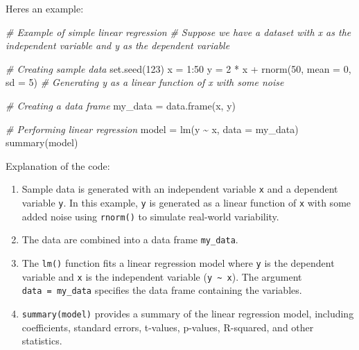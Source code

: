 \documentclass[
]{article}
\newenvironment{Shaded}{}{}
\newcommand{\AttributeTok}[1]{\textcolor[rgb]{0.49,0.56,0.16}{#1}}
\newcommand{\CommentTok}[1]{\textcolor[rgb]{0.38,0.63,0.69}{\textit{#1}}}
\newcommand{\DecValTok}[1]{\textcolor[rgb]{0.25,0.63,0.44}{#1}}
\newcommand{\FunctionTok}[1]{\textcolor[rgb]{0.02,0.16,0.49}{#1}}
\newcommand{\NormalTok}[1]{#1}
\newcommand{\OtherTok}[1]{\textcolor[rgb]{0.00,0.44,0.13}{#1}}
\newcommand{\SpecialCharTok}[1]{\textcolor[rgb]{0.25,0.44,0.63}{#1}}
\begin{document}
Here\textquotesingle s an example:

\begin{Shaded}
\begin{Highlighting}[]
\CommentTok{\# Example of simple linear regression}
\CommentTok{\# Suppose we have a dataset with \textquotesingle{}x\textquotesingle{} as the independent variable and \textquotesingle{}y\textquotesingle{} as the dependent variable}

\CommentTok{\# Creating sample data}
\FunctionTok{set.seed}\NormalTok{(}\DecValTok{123}\NormalTok{)}
\NormalTok{x }\OtherTok{=} \DecValTok{1}\SpecialCharTok{:}\DecValTok{50}
\NormalTok{y }\OtherTok{=} \DecValTok{2} \SpecialCharTok{*}\NormalTok{ x }\SpecialCharTok{+} \FunctionTok{rnorm}\NormalTok{(}\DecValTok{50}\NormalTok{, }\AttributeTok{mean =} \DecValTok{0}\NormalTok{, }\AttributeTok{sd =} \DecValTok{5}\NormalTok{)  }\CommentTok{\# Generating \textquotesingle{}y\textquotesingle{} as a linear function of \textquotesingle{}x\textquotesingle{} with some noise}

\CommentTok{\# Creating a data frame}
\NormalTok{my\_data }\OtherTok{=} \FunctionTok{data.frame}\NormalTok{(x, y)}

\CommentTok{\# Performing linear regression}
\NormalTok{model }\OtherTok{=} \FunctionTok{lm}\NormalTok{(y }\SpecialCharTok{\textasciitilde{}}\NormalTok{ x, }\AttributeTok{data =}\NormalTok{ my\_data)}
\FunctionTok{summary}\NormalTok{(model)}
\end{Highlighting}
\end{Shaded}

Explanation of the code:

\begin{enumerate}
\def\labelenumi{\arabic{enumi}.}
\item
  Sample data is generated with an independent variable \texttt{x} and a
  dependent variable \texttt{y}. In this example, \texttt{y} is
  generated as a linear function of \texttt{x} with some added noise
  using \texttt{rnorm()} to simulate real-world variability.
\item
  The data are combined into a data frame \texttt{my\_data}.
\item
  The \texttt{lm()} function fits a linear regression model where
  \texttt{y} is the dependent variable and \texttt{x} is the independent
  variable (\texttt{y\ \textasciitilde{}\ x}). The argument
  \texttt{data\ =\ my\_data} specifies the data frame containing the
  variables.
\item
  \texttt{summary(model)} provides a summary of the linear regression
  model, including coefficients, standard errors, t-values, p-values,
  R-squared, and other statistics.
\end{enumerate}
\end{document}
